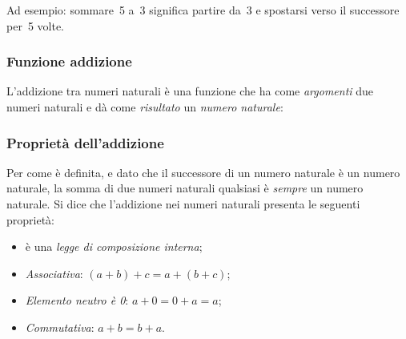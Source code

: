 Ad esempio: sommare~5 a~3 significa partire da~3 e spostarsi verso il 
successore per~5 volte.


\vspace{-.5em}
\subsubsection{Funzione addizione}

L'addizione tra numeri naturali è una funzione che ha come \emph{argomenti} 
due numeri naturali e dà come \emph{risultato} un \emph{numero naturale}:

\vspace{.5em}

\subsubsection{Proprietà dell'addizione}

Per come è definita, e dato che il successore di un numero naturale è un 
numero naturale, la somma di due numeri naturali qualsiasi è \emph{sempre} 
un numero naturale. 
Si dice che l'addizione nei numeri naturali presenta le seguenti proprietà:

\begin{itemize} [noitemsep]
 \item è una \emph{legge di composizione interna};
 \item \emph{Associativa}: \quad \((a + b) + c = a + (b + c)\);
 \item \emph{Elemento neutro è 0}: \quad \(a + 0 = 0 + a = a\);
 \item \emph{Commutativa}: \quad \(a + b = b + a\).
\end{itemize}

